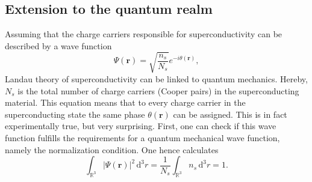 \documentclass{report}
\numberwithin{tm}{section}
\newcommand\vect[1]{\ensuremath{\bm{#1}}}
\begin{document}
\subsection{Extension to the quantum realm}
Assuming that the charge carriers responsible for superconductivity can be described by a wave function \begin{equation}
	\Psi(\vect{r}) = \sqrt{\frac{n_s}{N_s}}e^{-i\theta(\vect{r})},
\end{equation} Landau theory of superconductivity can be linked to quantum mechanics. Hereby, $N_s$ is the total number of charge carriers (Cooper pairs) in the superconducting material. This equation means that to every charge carrier in the superconducting state the same phase $\theta(\vect{r})$ can be assigned. This is in fact experimentally true, but very surprising. First, one can check if this wave function fulfills the requirements for a quantum mechanical wave function, namely the normalization condition. One hence calculates \begin{equation}
	\int_{\mathbb{R}^3}|\Psi(\vect{r})|^2\,\mathrm{d}^3r = \frac{1}{N_s}\int_{\mathbb{R}^3}n_s\,\mathrm{d}^3r = 1.
\end{equation}
\end{document}
